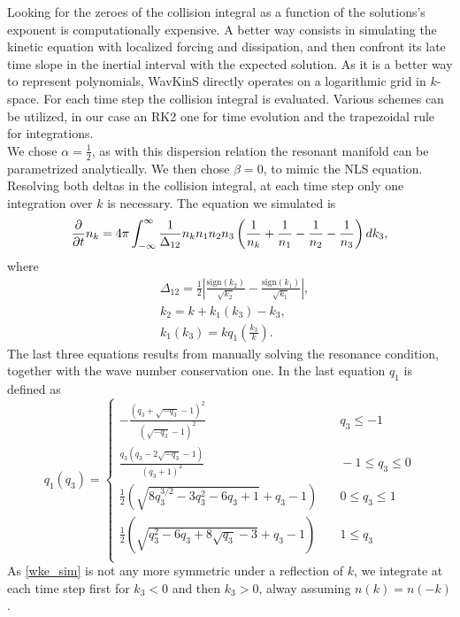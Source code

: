     Looking for the zeroes of the collision integral as a function of the solutions's exponent is computationally expensive. A better way consists in simulating the kinetic equation with localized forcing and dissipation, and then confront its late time slope in the inertial interval with the expected solution. As it is a better way to represent polynomials, WavKinS directly operates on a logarithmic grid in $k$-space. For each time step the collision integral is evaluated. Various schemes can be utilized, in our case an RK2 one for time evolution and the trapezoidal rule for integrations.\\
    We chose $\alpha = \frac{1}{2}$, as with this dispersion relation the resonant manifold can be parametrized analytically.
    We then chose $\beta = 0$, to mimic the NLS equation. Resolving both deltas in the collision integral, at each time step only one integration over $k$ is necessary. The equation we simulated is
    \begin{equation}
        \frac{\partial}{\partial t} n_k=4\pi \int_{-\infty}^\infty\frac{1}{\Delta_{12}}n_kn_1n_2n_3\left(\frac{1}{n_k}+\frac{1}{n_1}-\frac{1}{n_2}-\frac{1}{n_3}   \right)dk_3,  
        \label{wke_sim} 
    \end{equation}     
    where 
    \begin{equation}
        \begin{aligned}
            &\Delta_{12}=\frac{1}{2}\left| \frac{\text{sign}{(k_2)}}{\sqrt{k_2}}- \frac{\text{sign}{(k_1)}}{\sqrt{k_1}}  \right|, \\
            &k_2=k+k_1(k_3)-k_3, \\
            &k_1(k_3)=k q_1\left(\frac{k_3}{k}\right).
        \end{aligned}
    \end{equation}
    The last three equations results from manually solving the resonance condition, together with the wave number conservation one. In the last equation $q_1$ is defined as 
    \begin{equation}
        q_1(q_3) = \left\{
        \begin{array}{ll}
            -\frac{\left(q_3+\sqrt{-q_3}-1\right)^2}{\left(\sqrt{-q_3}-1\right)^2} & \quad q_3 \leq -1 \\
            \frac{q_3 \left(q_3-2 \sqrt{-q_3}-1\right)}{(q_3+1)^2} & \quad -1 \leq q_3 \leq 0\\
            \frac{1}{2} \left(\sqrt{8 q_3^{3/2}-3 q_3^2-6 q_3+1}+q_3-1\right) & \quad 0 \leq q_3 \leq 1\\
            \frac{1}{2} \left(\sqrt{q_3^2-6 q_3+8 \sqrt{q_3}-3}+q_3-1\right) & \quad 1 \leq q_3\\
        \end{array}
    \right.
    \end{equation}
    As \eqref{wke_sim} is not any more symmetric under a reflection of $k$, we integrate at each time step first for $k_3 < 0$ and then $k_3 > 0$, alway assuming $n(k) = n(-k)$. \\

